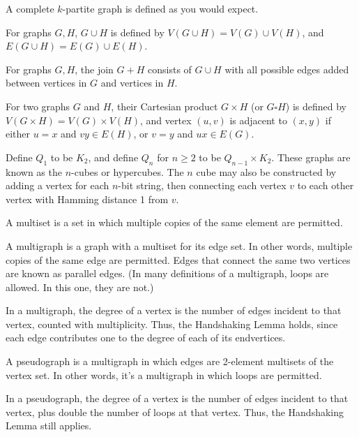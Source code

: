 \documentclass{article}
\begin{document}
    A complete $k$-partite graph is defined as you would expect.

\medskip{}

    For graphs $G, H$, $G \cup H$ is defined by $V(G \cup H) = V(G) \cup V(H)$, and $E(G \cup H) = E(G) \cup E(H)$.

\medskip{}

    For graphs $G, H$, the join $G + H$ consists of $G \cup H$ with all possible edges added between vertices in $G$ and vertices in $H$.

\medskip{}

    For two graphs $G$ and $H$, their Cartesian product $G \times H$ (or $G \square H$) is defined by $V(G \times H) = V(G) \times V(H)$, and vertex $(u,v)$ is adjacent to $(x,y)$ if either $u=x$ and $vy \in E(H)$, or $v=y$ and $ux \in E(G)$.

\medskip{}

    Define $Q_1$ to be $K_2$, and define $Q_n$ for $n \geq 2$ to be $Q_{n-1} \times K_2$.
    These graphs are known as the $n$-cubes or hypercubes.
    The $n$ cube may also be constructed by adding a vertex for each $n$-bit string, then connecting each vertex $v$ to each other vertex with Hamming distance 1 from $v$.

\medskip{}

    A multiset is a set in which multiple copies of the same element are permitted.

\medskip{}

    A multigraph is a graph with a multiset for its edge set. In other words, multiple copies of the same edge are permitted. Edges that connect the same two vertices are known as parallel edges. (In many definitions of a multigraph, loops are allowed. In this one, they are not.)

    In a multigraph, the degree of a vertex is the number of edges incident to that vertex, counted with multiplicity. Thus, the Handshaking Lemma holds, since each edge contributes one to the degree of each of its endvertices.

\medskip{}

    A pseudograph is a multigraph in which edges are 2-element multisets of the vertex set. In other words, it's a multigraph in which loops are permitted.

    In a pseudograph, the degree of a vertex is the number of edges incident to that vertex, plus double the number of loops at that vertex. Thus, the Handshaking Lemma still applies.
\end{document}
